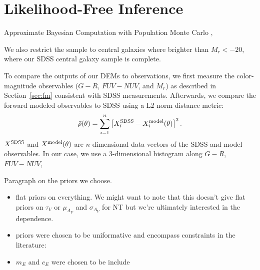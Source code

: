 \section{Likelihood-Free Inference} \label{sec:abc}
Approximate Bayesian Computation with Population Monte Carlo \cite{hahn2017a},

We also restrict the
sample to central galaxies where brighter than $M_r < -20$, where our SDSS 
central galaxy sample is complete. 



To compare the outputs of our DEMs to observations, we first measure the color-magnitude
observables ($G-R$, $FUV-NUV$, and $M_r$) as described in Section~\ref{sec:fm}
consistent with SDSS measurements. Afterwards, we compare the forward modeled
observables to SDSS using a L2 norm distance metric: 
\begin{equation}
    \bar{\rho}(\theta) = \sum\limits_{i=1}^{n} \left[X^{\rm SDSS}_i - X^{\rm model}_i(\theta) \right]^2.
\end{equation}
$X^{\rm SDSS}$ and $X^{\rm model}(\theta)$ are $n$-dimensional data vectors of
the SDSS and model observables. In our case, we use a 3-dimensional histogram
along $G-R$, $FUV-NUV$, 

\cite{ishida2015} 

Paragraph on the priors we choose. 
\begin{itemize}
    \item flat priors on everything. We might want to note that this doesn't
        give flat priors on $\tau_V$ or $\mu_{A_V}$ and $\sigma_{A_V}$ for NT
        but we're ultimately interested in the dependence. 
    \item priors were chosen to be uniformative and encompass constraints in
        the literature:
    \item $m_E$ and $c_E$ were chosen to be include \cite{kriek2013, narayanan2018, tress2018} 
\end{itemize}
